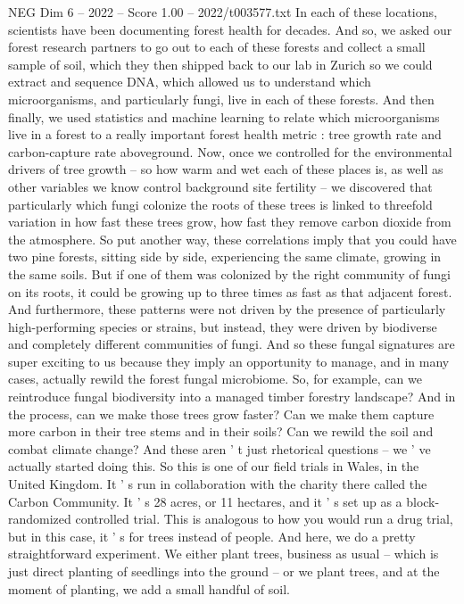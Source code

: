 \begin{textsample}{NEG Dim 6 – 2022 – Score 1.00 – 2022/t003577.txt}
In each of these locations, scientists have been documenting forest health for decades.
And so, we asked our forest research partners to go out to each of these forests and collect a small sample of soil, which they then shipped back to our lab in Zurich so we could extract and sequence DNA, which allowed us to understand which microorganisms, and particularly fungi, live in each of these forests.
And then finally, we used statistics and machine learning to relate which microorganisms live in a forest to a really important forest health metric : tree growth rate and carbon-capture rate aboveground.
Now, once we controlled for the environmental drivers of tree growth -- so how warm and wet each of these places is, as well as other variables we know control background site fertility -- we discovered that particularly which fungi colonize the roots of these trees is linked to threefold variation in how fast these trees grow, how fast they remove carbon dioxide from the atmosphere.
So put another way, these correlations imply that you could have two pine forests, sitting side by side, experiencing the same climate, growing in the same soils.
But if one of them was colonized by the right community of fungi on its roots, it could be growing up to three times as fast as that adjacent forest.
And furthermore, these patterns were not driven by the presence of particularly high-performing species or strains, but instead, they were driven by biodiverse and completely different communities of fungi.
And so these fungal signatures are super exciting to us because they imply an opportunity to manage, and in many cases, actually rewild the forest fungal microbiome.
So, for example, can we reintroduce fungal biodiversity into a managed timber forestry landscape?
And in the process, can we make those trees grow faster?
Can we make them capture more carbon in their tree stems and in their soils?
Can we rewild the soil and combat climate change?
And these aren ' t just rhetorical questions -- we ' ve actually started doing this.
So this is one of our field trials in Wales, in the United Kingdom.
It ' s run in collaboration with the charity there called the Carbon Community.
It ' s 28 acres, or 11 hectares, and it ' s set up as a block-randomized controlled trial.
This is analogous to how you would run a drug trial, but in this case, it ' s for trees instead of people.
And here, we do a pretty straightforward experiment.
We either plant trees, business as usual -- which is just direct planting of seedlings into the ground -- or we plant trees, and at the moment of planting, we add a small handful of soil.

\end{textsample}
